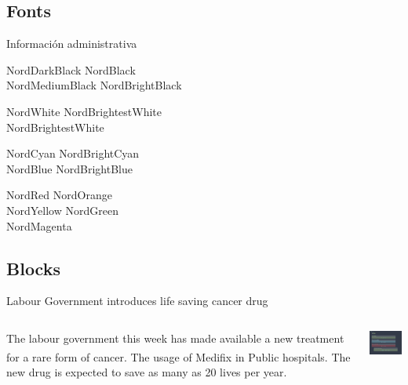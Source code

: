 \documentclass[aspectratio=169,compress]{beamer}
\begin{document}
\subsection{Fonts}

\begin{frame}{Información administrativa}
  \begin{description}
  \item[Docentes]
    \textcolor{NordDarkBlack}{NordDarkBlack} \quad \textcolor{NordBlack}{NordBlack}\\
    \textcolor{NordMediumBlack}{NordMediumBlack} \quad \textcolor{NordBrightBlack}{NordBrightBlack}
  \item[Snow Storm]
    \textcolor{NordWhite}{NordWhite} \quad \textcolor{NordBrighterWhite}{NordBrightestWhite}\\
    \textcolor{NordBrightestWhite}{NordBrightestWhite}
  \item[Forest]
    \textcolor{NordCyan}{NordCyan} \quad \textcolor{NordBrightCyan}{NordBrightCyan}\\
    \textcolor{NordBlue}{NordBlue} \quad \textcolor{NordBrightBlue}{NordBrightBlue}
  \item[Aurora]
    \textcolor{NordRed}{NordRed} \quad \textcolor{NordOrange}{NordOrange} \\
    \textcolor{NordYellow}{NordYellow} \quad \textcolor{NordGreen}{NordGreen} \\
    \textcolor{NordMagenta}{NordMagenta}
  \end{description}
\end{frame}



\subsection{Blocks}

\begin{frame}
\begin{block}{Labour Government introduces life saving cancer drug}

    \begin{columns}[onlytextwidth,T]
      \column{\dimexpr\linewidth-30mm-5mm}

      The labour government this week has made available a new treatment
      for a rare form of cancer. The usage of
      Medifix\textsuperscript{\textregistered} in Public hospitals. The
      new drug is expected to save as many as 20 lives per year.

      \column{30mm}
      \includegraphics[width=30mm]{dark.png}

    \end{columns}
  \end{block}

\end{frame}
\end{document}
